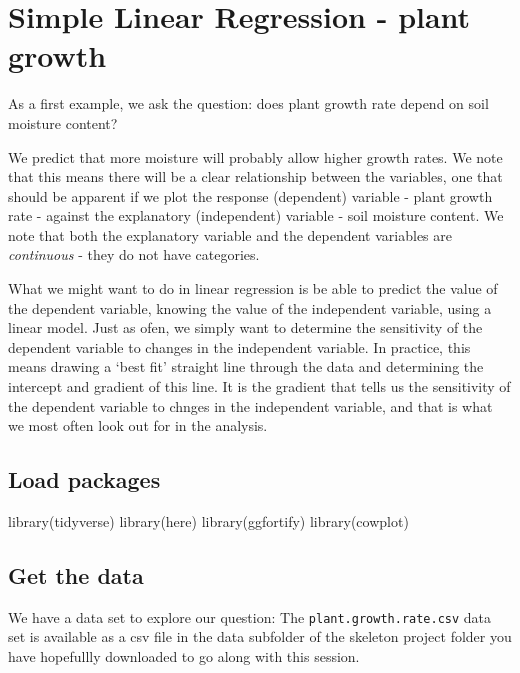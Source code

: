 \documentclass[
  letterpaper,
  DIV=11,
  numbers=noendperiod]{scrreprt}
\newenvironment{Shaded}{\begin{snugshade}}{\end{snugshade}}
\newcommand{\FunctionTok}[1]{\textcolor[rgb]{0.28,0.35,0.67}{#1}}
\newcommand{\NormalTok}[1]{\textcolor[rgb]{0.00,0.23,0.31}{#1}}
\begin{document}
\section{Simple Linear Regression - plant
growth}\label{simple-linear-regression---plant-growth}

As a first example, we ask the question: does plant growth rate depend
on soil moisture content?

We predict that more moisture will probably allow higher growth rates.
We note that this means there will be a clear relationship between the
variables, one that should be apparent if we plot the response
(dependent) variable - plant growth rate - against the explanatory
(independent) variable - soil moisture content. We note that both the
explanatory variable and the dependent variables are \emph{continuous} -
they do not have categories.

What we might want to do in linear regression is be able to predict the
value of the dependent variable, knowing the value of the independent
variable, using a linear model. Just as ofen, we simply want to
determine the sensitivity of the dependent variable to changes in the
independent variable. In practice, this means drawing a `best fit'
straight line through the data and determining the intercept and
gradient of this line. It is the gradient that tells us the sensitivity
of the dependent variable to chnges in the independent variable, and
that is what we most often look out for in the analysis.

\subsection{Load packages}\label{load-packages-4}

\begin{Shaded}
\begin{Highlighting}[]
\FunctionTok{library}\NormalTok{(tidyverse)}
\FunctionTok{library}\NormalTok{(here)}
\FunctionTok{library}\NormalTok{(ggfortify)}
\FunctionTok{library}\NormalTok{(cowplot)}
\end{Highlighting}
\end{Shaded}

\subsection{Get the data}\label{get-the-data}

We have a data set to explore our question: The
\texttt{plant.growth.rate.csv} data set is available as a csv file in
the data subfolder of the skeleton project folder you have hopefullly
downloaded to go along with this session.
\end{document}
